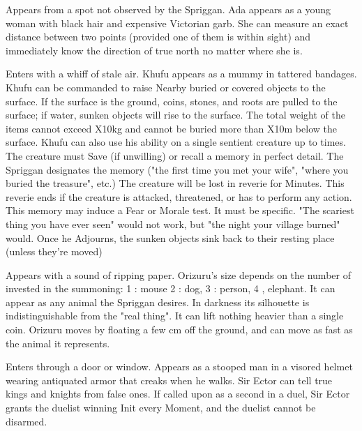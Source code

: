 {
Appears from a spot not observed by the Spriggan.  Ada appears as a young woman with black hair and expensive Victorian garb.  She can measure an exact distance between two points (provided one of them is within sight) and immediately know the direction of true north no matter where she is. 



Enters with a whiff of stale air.  Khufu appears as a mummy in tattered bandages.  Khufu can be commanded to raise Nearby buried or covered objects to the surface.  If the surface is the ground, coins, stones, and roots are pulled to the surface; if water, sunken objects will rise to the surface.  The total weight of the items cannot exceed \SUMDICE X10kg and cannot be buried more than \DICE X10m below the surface.  Khufu can also use his ability on a single sentient creature up to \DICE times.  The creature must Save (if unwilling) or recall a memory in perfect detail.  The Spriggan designates the memory ("the first time you met your wife", "where you buried the treasure", etc.)  The creature will be lost in reverie for \SUMDICE Minutes.  This reverie ends if the creature is attacked, threatened, or has to perform any action. This memory may induce a Fear or Morale test. It must be specific. "The scariest thing you have ever seen" would not work, but "the night your village burned" would.  Once he Adjourns, the sunken objects sink back to their resting place (unless they're moved)


Appears with a sound of ripping paper.  Orizuru's size depends on the number of \DICE invested in the summoning: 1 \DICE: mouse 2 \DICE: dog, 3 \DICE: person, 4 \DICE, elephant.  It can appear as any animal the Spriggan desires.  In darkness its silhouette is indistinguishable from the "real thing".   It can lift nothing heavier than a single coin. Orizuru moves by floating a few cm off the ground, and can move as fast as the animal it represents. 


Enters through a door or window.  Appears as a stooped man in a visored helmet wearing antiquated armor that creaks when he walks.  Sir Ector can tell true kings and knights from false ones.  If called upon as a second in a duel, Sir Ector grants the duelist winning Init every Moment, and the duelist cannot be disarmed.



}
